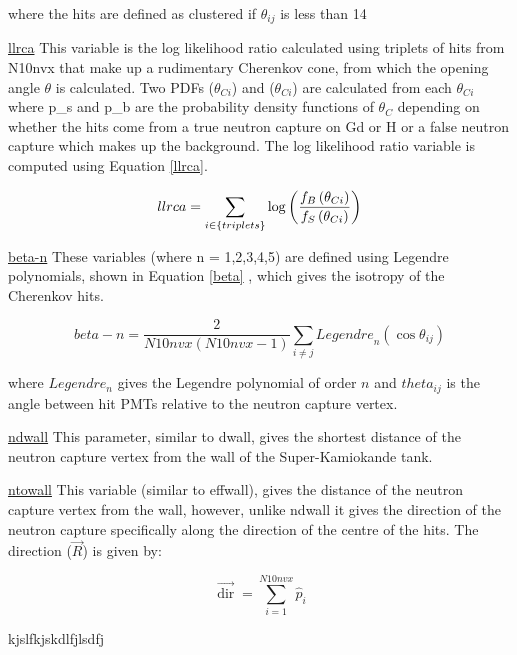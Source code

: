 where the hits are defined as clustered if $\theta_{ij}$ is less than 14


\underline{llrca}
\newline
This variable is the log likelihood ratio calculated using triplets of hits from N10nvx that make up a rudimentary Cherenkov cone, from which the opening angle $\theta$ is calculated. Two PDFs ($\theta_{Ci}$) and ($\theta_{Ci}$) are calculated from each $\theta_{Ci}$ where p\_s and p\_b are the probability density functions of $\theta_{C}$ depending on whether the hits come from a true neutron capture on Gd or H or a false neutron capture which makes up the background. The log likelihood ratio variable is computed using Equation {\ref{llrca}}.

\begin{equation}
\label{llrca}
\newline
  llrca =\sum_{i \in\{ { triplets }\}} \log \left(\frac{f_{B}\left(\theta_{C i}\right)}{f_{S}\left(\theta_{C i}\right)}\right)
\end{equation}


\underline{beta-n}
\newline
These variables (where n = 1,2,3,4,5) are defined using Legendre polynomials, shown in Equation \ref{beta} \cite{snopaper}, which gives the isotropy of the Cherenkov hits.

\begin{equation}
\label{beta}
 beta- n=\frac{2}{N 10 {nvx}(N 10 {nvx}-1)} \sum_{i \neq j}  { Legendre }_{n}\left(\cos \theta_{i j}\right)
\end{equation}

where $Legendre_n$ gives the Legendre polynomial of order $n$ and $theta_{ij}$ is the angle between hit PMTs relative to the neutron capture vertex.



\underline{ndwall}
\newline
This parameter, similar to dwall, gives the shortest distance of the neutron capture vertex from the wall of the Super-Kamiokande tank.
\newline



\underline{ntowall}
\newline
This variable (similar to effwall), gives the distance of the neutron capture vertex from the wall, however, unlike ndwall it gives the direction of the neutron capture specifically along the direction of the centre of the hits. The direction ($\overrightarrow{R}$) is given by:

\begin{equation}
\overrightarrow{\operatorname{dir}}=\sum_{i=1}^{N 10 n v x} \hat{p}_{i}
\end{equation}

kjslfkjskdlfjlsdfj



